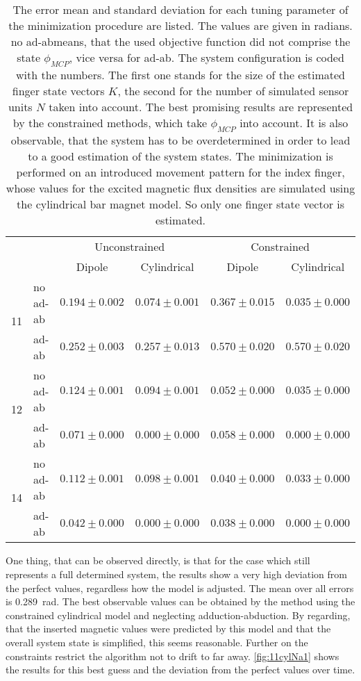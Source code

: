 \begin{table}[!htb]
\centering
\begin{tabular}{l l c c c c}
\toprule
 & &          				\multicolumn{2}{c}{Unconstrained}          &		\multicolumn{2}{c}{Constrained}\\ \cmidrule(lr){3-4}\cmidrule(lr){5-6}
 & & 								Dipole   			   & Cylindrical 	 			 & 		Dipole 			& 		Cylindrical \\ \midrule[2pt]
\multirow{2}{*}{11} & no ad-ab    & $ 0.194 \pm 0.002 $ & $ 0.074 \pm 0.001 $ & $ 0.367 \pm 0.015 $ & $ 0.035 \pm 0.000 $ \\ 
					& ad-ab		 & $ 0.252 \pm 0.003 $ & $ 0.257 \pm 0.013 $ & $ 0.570 \pm 0.020 $ & $ 0.570 \pm 0.020 $ \\ \midrule
\multirow{2}{*}{12} & no ad-ab    & $ 0.124 \pm 0.001 $ & $ 0.094 \pm 0.001 $ & $ 0.052 \pm 0.000 $ & $ 0.035 \pm 0.000 $ \\ 
					& ad-ab		 & $ 0.071 \pm 0.000 $ & $ 0.000 \pm 0.000 $ & $ 0.058 \pm 0.000 $ & $ 0.000 \pm 0.000 $\\ \midrule
\multirow{2}{*}{14} & no ad-ab    & $ 0.112 \pm 0.001 $ & $ 0.098 \pm 0.001 $ & $ 0.040 \pm 0.000 $ & $ 0.033 \pm 0.000 $ \\ 
					& ad-ab		 & $ 0.042 \pm 0.000 $ & $ 0.000 \pm 0.000 $ & $ 0.038 \pm 0.000 $ & $ 0.000 \pm 0.000 $\\										
\bottomrule
\end{tabular}
\caption[Quality of the minimization method for estimating one finger]
{The error mean and standard deviation for each tuning parameter of the minimization procedure are listed. The values are given in radians. \grqq no ad-ab\grqq means, that the used objective function did not comprise the state $ \phi_{MCP} $, vice versa for \grqq ad-ab\grqq. The system configuration is coded with the numbers. The first one stands for the size of the estimated finger state vectors $ K $, the second for the number of simulated sensor units $ N $ taken into account. The best promising results are represented by the constrained methods, which take $ \phi_{MCP} $ into account. It is also observable, that the system has to be overdetermined in order to lead to a good estimation of the system states. The minimization is performed on an introduced movement pattern for the index finger, whose values for the excited magnetic flux densities are simulated using the cylindrical bar magnet model. So only one finger state vector is estimated.}
\label{tab:oneFing}
\end{table}
One thing, that can be observed directly, is that for the case \grqq which still represents a full determined system, the results show a very high deviation from the perfect values, regardless how the model is adjusted. The mean over all errors is \SI{0.289}{\radian}. The best observable values can be obtained by the method using the constrained cylindrical model and neglecting adduction-abduction. By regarding, that the inserted magnetic values were predicted by this model and that the overall system state is simplified, this seems reasonable. Further on the constraints restrict the algorithm not to drift to far away. \ref{fig:11cylNa1} shows the results for this best guess and the deviation from the perfect values over time. \\
